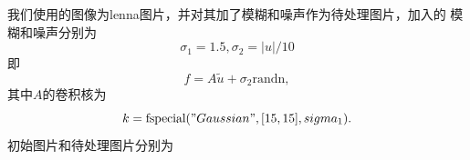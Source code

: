 \documentclass[a4paper,  11pt]{ctexart}
\begin{document}
我们使用的图像为lenna图片，并对其加了模糊和噪声作为待处理图片，加入的
模糊和噪声分别为
\[    
      \sigma_1 = 1.5, \sigma_2 = |u|/10
\]
即
\[  
  f = A\tilde{u} + \sigma_2\text{randn},
\]
其中$A$的卷积核为
\[   
   k = \text{fspecial}("Gaussian",[15,15],sigma_1).
\]
初始图片和待处理图片分别为
\begin{figure}[H]
\end{figure}
\end{document}
